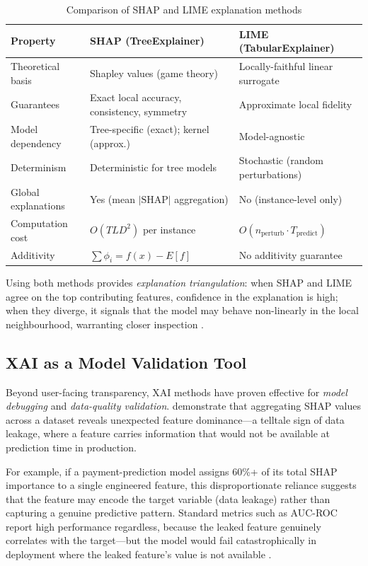 \documentclass[12pt,a4paper]{report}
\begin{document}
\begin{table}[H]
\centering
\caption{Comparison of SHAP and LIME explanation methods}
\label{tab:shap_vs_lime}
\begin{tabularx}{\textwidth}{l >{\raggedright\arraybackslash}X >{\raggedright\arraybackslash}X}
\toprule
\textbf{Property} & \textbf{SHAP (TreeExplainer)} & \textbf{LIME (TabularExplainer)} \\
\midrule
Theoretical basis & Shapley values (game theory) & Locally-faithful linear surrogate \\
Guarantees & Exact local accuracy, consistency, symmetry & Approximate local fidelity \\
Model dependency & Tree-specific (exact); kernel (approx.) & Model-agnostic \\
Determinism & Deterministic for tree models & Stochastic (random perturbations) \\
Global explanations & Yes (mean $|\text{SHAP}|$ aggregation) & No (instance-level only) \\
Computation cost & $O(TLD^2)$ per instance & $O(n_{\text{perturb}} \cdot T_{\text{predict}})$ \\
Additivity & $\sum \phi_i = f(x) - E[f]$ & No additivity guarantee \\
\bottomrule
\end{tabularx}
\end{table}

Using both methods provides \textit{explanation triangulation}: when SHAP and LIME agree on the top contributing features, confidence in the explanation is high; when they diverge, it signals that the model may behave non-linearly in the local neighbourhood, warranting closer inspection \citep{molnar2022interpretable}.

\subsection{XAI as a Model Validation Tool}

Beyond user-facing transparency, XAI methods have proven effective for \textit{model debugging} and \textit{data-quality validation}. \citet{lundberg2020local} demonstrate that aggregating SHAP values across a dataset reveals unexpected feature dominance---a telltale sign of data leakage, where a feature carries information that would not be available at prediction time in production.

For example, if a payment-prediction model assigns 60\%+ of its total SHAP importance to a single engineered feature, this disproportionate reliance suggests that the feature may encode the target variable (data leakage) rather than capturing a genuine predictive pattern. Standard metrics such as AUC-ROC report high performance regardless, because the leaked feature genuinely correlates with the target---but the model would fail catastrophically in deployment where the leaked feature's value is not available \citep{molnar2022interpretable}.
\end{document}
